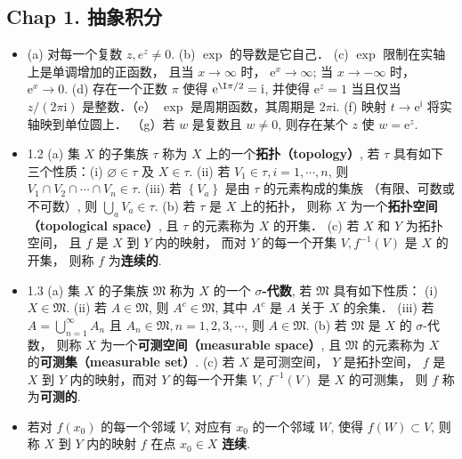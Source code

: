 
\subsection{Chap 1. 抽象积分}
\begin{itemize}
\item (a) 对每一个复数 $z, e^{z} \neq 0$. (b) $\exp$ 的导数是它自己． (c) $\exp$ 限制在实轴上是单调增加的正函数， 且当 $x \rightarrow \infty$ 时， $\mathrm{e}^{x} \rightarrow \infty$; 当 $x \rightarrow-\infty$ 时， $\mathrm{e}^{x} \rightarrow 0$.
(d) 存在一个正数 $\pi$ 使得 $\mathrm{e}^{\I\pi / 2}=\mathrm{i}$, 并使得 $\mathrm{e}^{z}=1$ 当且仅当 $z /(2 \pi \mathrm{i})$ 是整数．（e） $\exp$ 是周期函数，其周期是 $2 \pi \mathrm{i}$. (f) 映射 $t \rightarrow \mathrm{e}^{\mathrm{i}}$ 将实轴映到单位圆上． （g）若 $w$ 是复数且 $w \neq 0$, 则存在某个 $z$ 使 $w=\mathrm{e}^{z}$.

\item 1.2 (a) 集 $X$ 的子集族 $\tau$ 称为 $X$ 上的一个\textbf{拓扑（topology）}, 若 $\tau$ 具有如下三个性质：(i) $\varnothing \in \tau$ 及 $X \in \tau$. (ii) 若 $V_{1} \in \tau, i=1, \cdots, n$, 则 $V_{1} \cap V_{2} \cap \cdots \cap V_{n} \in \tau$. (iii) 若 $\left\{V_{a}\right\}$ 是由 $\tau$ 的元素构成的集族 （有限、可数或不可数）, 则 $\bigcup_{a} V_{a} \in \tau$. (b) 若 $\tau$ 是 $X$ 上的拓扑， 则称 $X$ 为一个\textbf{拓扑空间（topological space）}, 且 $\tau$ 的元素称为 $X$ 的开集． (c) 若 $X$ 和 $Y$ 为拓扑空间， 且 $f$ 是 $X$ 到 $Y$ 内的映射， 而对 $Y$ 的每一个开集 $V, f^{-1}(V)$ 是 $X$ 的开集， 则称 $f$ 为\textbf{连续的}.

\item 1.3 (a) 集 $X$ 的子集族 $\mathfrak{M}$ 称为 $X$ 的一个 \textbf{$\sigma$-代数}, 若 $\mathfrak{M}$ 具有如下性质： (i) $X \in \mathfrak{M}$. (ii) 若 $A \in \mathfrak{M}$, 则 $A^{c} \in \mathfrak{M}$, 其中 $A^{c}$ 是 $A$ 关于 $X$ 的余集． (iii) 若 $A=\bigcup_{n=1}^{\infty} A_{n}$ 且 $A_{n} \in \mathfrak{M}, n=1,2,3, \cdots$, 则 $A \in \mathfrak{M}$. (b) 若 $\mathfrak{M}$ 是 $X$ 的 $\sigma$-代数， 则称 $X$ 为一个\textbf{可测空间（measurable space）}, 且 $\mathfrak{M}$ 的元素称为 $X$ 的\textbf{可测集（measurable set）}. (c) 若 $X$ 是可测空间， $Y$ 是拓扑空间， $f$ 是 $X$ 到 $Y$ 内的映射，而对 $Y$ 的每一个开集 $V$, $f^{-1}(V)$ 是 $X$ 的可测集， 则 $f$ 称为\textbf{可测的}.

\item 若对 $f\left(x_{0}\right)$ 的每一个邻域 $V$, 对应有 $x_{0}$ 的一个邻域 $W$, 使得 $f(W) \subset V$, 则称 $X$ 到 $Y$ 内的映射 $f$ 在点 $x_{0} \in X$ \textbf{连续}.


\end{itemize}
